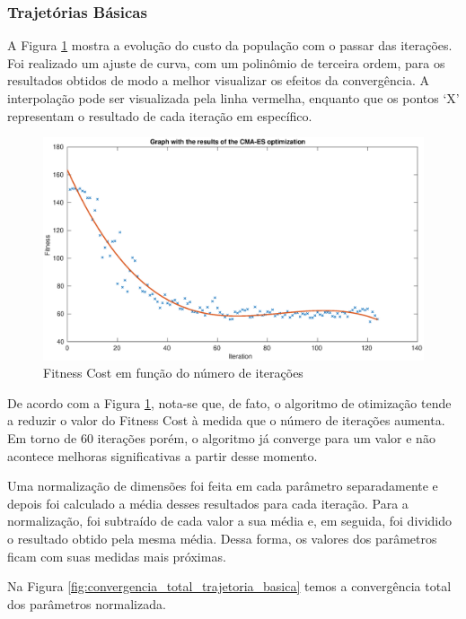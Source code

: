 \documentclass[10pt,fleqn,a4paper]{article}
\begin{document}
\subsubsection{Trajetórias Básicas}

A Figura \ref{fig:fitness_trajetoria_basica} mostra a evolução do custo da população com o passar das iterações. Foi realizado um ajuste de curva, com um polinômio de terceira ordem, para os resultados obtidos de modo a melhor visualizar os efeitos da convergência. A interpolação pode ser visualizada pela linha vermelha, enquanto que os pontos `X’ representam o resultado de cada iteração em específico.

\begin{figure}[H]
	\centering
	\includegraphics[width=1.0\textwidth]{figures/CMA-ES_Fitness_Results.eps}
	\caption{Fitness Cost em função do número de iterações}
	\label{fig:fitness_trajetoria_basica}
\end{figure}

De acordo com a Figura \ref{fig:fitness_trajetoria_basica}, nota-se que, de fato, o algoritmo de otimização tende a reduzir o valor do Fitness Cost à medida que o número de iterações aumenta. Em torno de 60 iterações porém, o algoritmo já converge para um valor e não acontece melhoras significativas a partir desse momento.

Uma normalização de dimensões foi feita em cada parâmetro separadamente e depois foi calculado a média desses resultados para cada iteração. Para a normalização, foi subtraído de cada valor a sua média e, em seguida, foi dividido o resultado obtido pela mesma média. Dessa forma, os valores dos parâmetros ficam com suas medidas mais próximas.

Na Figura \ref{fig:convergencia_total_trajetoria_basica} temos a convergência total dos parâmetros normalizada. 
\end{document}
